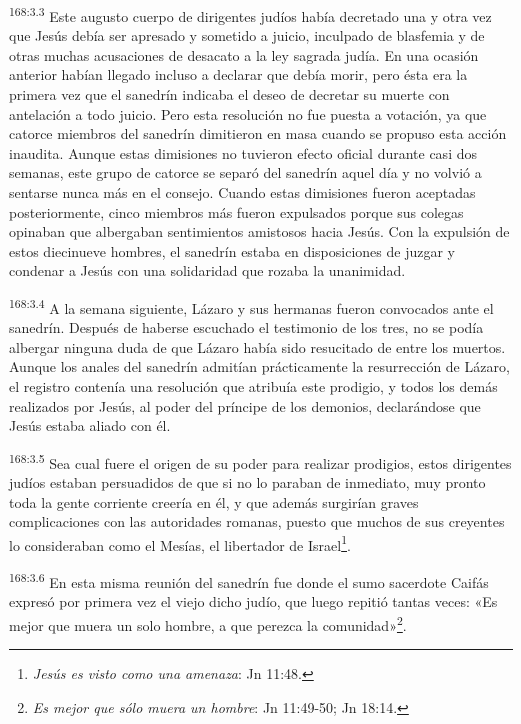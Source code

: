 \par 
\textsuperscript{168:3.3} Este augusto cuerpo de dirigentes judíos había decretado una y otra vez que Jesús debía ser apresado y sometido a juicio, inculpado de blasfemia y de otras muchas acusaciones de desacato a la ley sagrada judía. En una ocasión anterior habían llegado incluso a declarar que debía morir, pero ésta era la primera vez que el sanedrín indicaba el deseo de decretar su muerte con antelación a todo juicio. Pero esta resolución no fue puesta a votación, ya que catorce miembros del sanedrín dimitieron en masa cuando se propuso esta acción inaudita. Aunque estas dimisiones no tuvieron efecto oficial durante casi dos semanas, este grupo de catorce se separó del sanedrín aquel día y no volvió a sentarse nunca más en el consejo. Cuando estas dimisiones fueron aceptadas posteriormente, cinco miembros más fueron expulsados porque sus colegas opinaban que albergaban sentimientos amistosos hacia Jesús. Con la expulsión de estos diecinueve hombres, el sanedrín estaba en disposiciones de juzgar y condenar a Jesús con una solidaridad que rozaba la unanimidad.

\par 
\textsuperscript{168:3.4} A la semana siguiente, Lázaro y sus hermanas fueron convocados ante el sanedrín. Después de haberse escuchado el testimonio de los tres, no se podía albergar ninguna duda de que Lázaro había sido resucitado de entre los muertos. Aunque los anales del sanedrín admitían prácticamente la resurrección de Lázaro, el registro contenía una resolución que atribuía este prodigio, y todos los demás realizados por Jesús, al poder del príncipe de los demonios, declarándose que Jesús estaba aliado con él.

\par 
\textsuperscript{168:3.5} Sea cual fuere el origen de su poder para realizar prodigios, estos dirigentes judíos estaban persuadidos de que si no lo paraban de inmediato, muy pronto toda la gente corriente creería en él, y que además surgirían graves complicaciones con las autoridades romanas, puesto que muchos de sus creyentes lo consideraban como el Mesías, el libertador de Israel\footnote{\textit{Jesús es visto como una amenaza}: Jn 11:48.}.

\par 
\textsuperscript{168:3.6} En esta misma reunión del sanedrín fue donde el sumo sacerdote Caifás expresó por primera vez el viejo dicho judío, que luego repitió tantas veces: «Es mejor que muera un solo hombre, a que perezca la comunidad»\footnote{\textit{Es mejor que sólo muera un hombre}: Jn 11:49-50; Jn 18:14.}.

